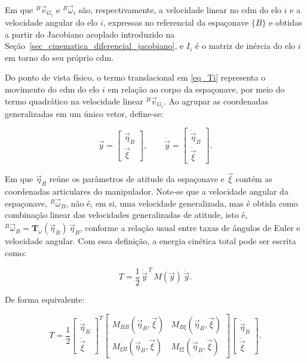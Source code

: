 Em que ${}^{B}\!\vec v_{G_i}$ e ${}^{B}\!\vec\omega_i$ são, respectivamente, a velocidade linear no \gls{cdm} do elo $i$
e a velocidade angular do elo $i$, expressas no referencial da espaçonave $\{B\}$ e obtidas a partir do Jacobiano acoplado introduzido na Seção~\ref{sec_cinematica_diferencial_jacobiano}, e $I_i$ é o
matriz de inércia do elo $i$ em torno do seu próprio \gls{cdm}.


Do ponto de vista físico, o termo translacional em \eqref{eq_Ti} representa o movimento do \gls{cdm} do elo $i$ em relação ao corpo da espaçonave, por meio do termo quadrático na velocidade linear ${}^{B}\!\vec v_{G_i}$.
Ao agrupar as coordenadas generalizadas em um único vetor, define-se:

\begin{equation}
\vec y
=
\begin{bmatrix}
\vec\eta_B \\
\vec{\xi}
\end{bmatrix},
\qquad
\dot{\vec y}
=
\begin{bmatrix}
\dot{\vec\eta}_B \\
\dot{\vec{\xi}}
\end{bmatrix}.
\label{eq_veloc_generalizadas}
\end{equation}

Em que $\vec\eta_B$ reúne os parâmetros de atitude da espaçonave e $\vec{\xi}$ contém as coordenadas articulares do manipulador.
Note-se que a velocidade angular da espaçonave,
${}^{B}\!\vec\omega_B$,
não é, em si, uma velocidade generalizada, mas é obtida como combinação linear das velocidades generalizadas de atitude, isto é,
${}^{B}\!\vec\omega_B = \mathbf{T}_\omega(\vec\eta_B)\,\dot{\vec\eta}_B$,
conforme a relação usual entre taxas de ângulos de Euler e velocidade angular.
Com essa definição, a energia cinética total pode ser escrita como:

\begin{equation}
T =
\frac{1}{2}\,\dot{\vec y}^{\,T}\,
M(\vec y)\,
\dot{\vec y}.
\label{eq_T_quadratica_Mq1}
\end{equation}

De forma equivalente:

\begin{equation}
T
=
\frac{1}{2}
\begin{bmatrix}
\dot{\vec{\eta}}_{B}\\
\dot{\vec{\xi}}
\end{bmatrix}^{T}
\begin{bmatrix}
M_{BB}(\vec{\eta}_B,\vec{\xi}) & M_{B\xi}(\vec{\eta}_B,\vec{\xi})\\
M_{\xi B}(\vec{\eta}_B,\vec{\xi}) & M_{\xi\xi}(\vec{\eta}_B,\vec{\xi})
\end{bmatrix}
\begin{bmatrix}
\dot{\vec{\eta}}_{B}\\
\dot{\vec{\xi}}
\end{bmatrix}.
\label{eq_T_quadratica_Mq2}
\end{equation}


